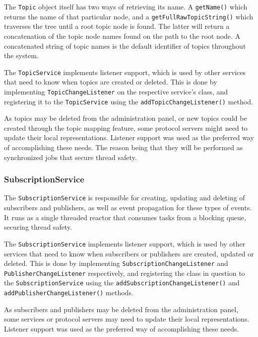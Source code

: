 The \verb!Topic! object itself has two ways of retrieving its name. A \verb!getName()! which returns the name of that particular node, and a \verb!getFullRawTopicString()! which traverses the tree until a root topic node is found. The latter will return a concatenation of the topic node names found on the path to the root node. A concatenated string of topic names is the default identifier of topics throughout the system.

The \verb!TopicService! implements listener support, which is used by other services that need to know when topics are created or deleted. This is done by implementing \verb!TopicChangeListener! on the respective service's class, and registering it to the \verb!TopicService! using the \verb!addTopicChangeListener()! method.

As topics may be deleted from the administration panel, or new topics could be created through the topic mapping feature, some protocol servers might need to update their local representations. Listener support was used as the preferred way of accomplishing these needs. The reason being that they will be performed as synchronized jobs that secure thread safety.

\subsubsection{SubscriptionService}
\label{subsec:architecture_and_implementation-implementation-core-subscriptionservice}

The \verb!SubscriptionService! is responsible for creating, updating and deleting of subscribers and publishers, as well as event propagation for these types of events. It runs as a single threaded reactor that consumes tasks from a blocking queue, securing thread safety.

The \verb!SubscriptionService! implements listener support, which is used by other services that need to know when subscribers or publishers are created, updated or deleted. This is done by implementing \verb!SubscriptionChangeListener! and \\ \verb!PublisherChangeListener! respectively, and registering the class in question to the \verb!SubscriptionService! using the \verb!addSubscriptionChangeListener()! and  \verb!addPublisherChangeListener()! methods.

As subscribers and publishers may be deleted from the administration panel, some services or protocol servers may need to update their local representations. Listener support was used as the preferred way of accomplishing these needs.

